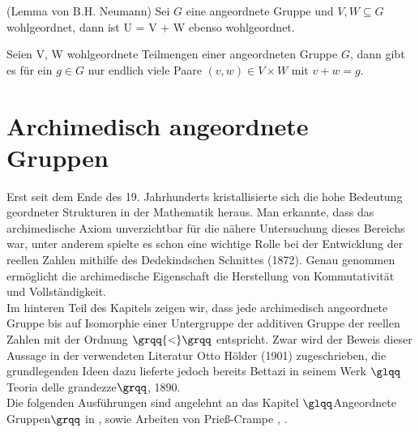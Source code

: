 \begin{lemma}\label{LemmaNeumann} (Lemma von B.H. Neumann) %
Sei $G$ eine angeordnete Gruppe und $V, W \subseteq G$ wohlgeordnet, dann ist U = V + W ebenso wohlgeordnet. 
\end{lemma}
\begin{folg}\label{FolgerungNeumann} %
Seien V, W wohlgeordnete Teilmengen einer angeordneten Gruppe $G$, dann gibt es für ein $g \in G$ nur endlich viele Paare $\left(v, w\right) \in V\times W$ mit $v + w = g$.
\end{folg}

\section{Archimedisch angeordnete Gruppen}\label{Archimedisch angeordnete Gruppen}
%
Erst seit dem Ende des 19. Jahrhunderts kristallisierte sich die hohe Bedeutung geordneter Strukturen in der Mathematik heraus. Man erkannte, dass das archimedische Axiom unverzichtbar für die nähere Untersuchung dieses Bereichs war, unter anderem spielte es schon eine wichtige Rolle bei der Entwicklung der reellen Zahlen mithilfe des Dedekindschen Schnittes (1872). Genau genommen ermöglicht die archimedische Eigenschaft die Herstellung von Kommutativität und Vollständigkeit. \\ %
Im hinteren Teil des Kapitels zeigen wir, dass jede archimedisch angeordnete Gruppe bis auf Isomorphie einer Untergruppe der additiven Gruppe der reellen Zahlen mit der Ordnung $\grqq{<}\grqq$ entspricht. Zwar wird der Beweis dieser Aussage in der verwendeten Literatur Otto Hölder (1901)\cite{hoelder1901} zugeschrieben, die grundlegenden Ideen dazu lieferte jedoch bereits Bettazi in seinem Werk $\glqq$Teoria delle grandezze$\grqq$, 1890\cite[S. 578]{Lueneburg08}.\\ 
Die folgenden Ausführungen sind angelehnt an das Kapitel $\glqq$Angeordnete Gruppen$\grqq$ in \cite[S. 73 - 93]{fuchs66}, sowie Arbeiten von Prieß-Crampe \cite{priesscrampe69}, \cite{priesscrampe83}.

